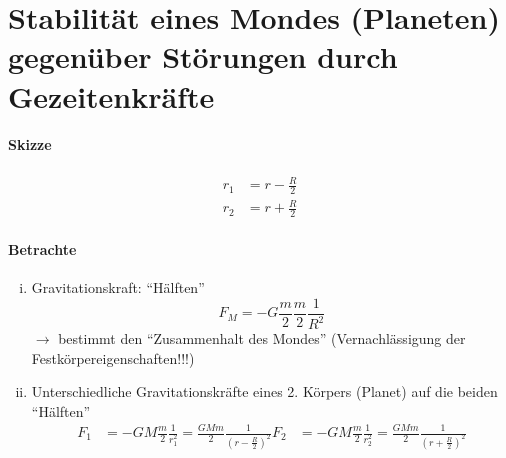 \section{Stabilität eines Mondes (Planeten) gegenüber Störungen durch 
         Gezeitenkräfte}
\paragraph{Skizze}
\begin{center}
\end{center}
\begin{align*}
    r_1 &= r - \frac{R}{2} \\
    r_2 &= r + \frac{R}{2}
\end{align*}

\paragraph{Betrachte}
\begin{enumerate}[i)]
    \item Gravitationskraft: "`Hälften"'
        \[ F_M = - G \frac{m}{2} \frac{m}{2} \frac{1}{R^2} \]
        $\rightarrow$ bestimmt den "`Zusammenhalt des Mondes"'
        (Vernachlässigung der Festkörpereigenschaften!!!)
    \item Unterschiedliche Gravitationskräfte eines 2. Körpers (Planet) auf
        die beiden "`Hälften"'
        \begin{align*}
            F_1 &= -G M \frac{m}{2} \frac{1}{r_1^2} = \frac{GMm}{2} \frac{1}{\left(r-\frac{R}{2}\right)^2}
            F_2 &= -G M \frac{m}{2} \frac{1}{r_2^2} = \frac{GMm}{2} \frac{1}{\left(r+\frac{R}{2}\right)^2}
        \end{align*}
\end{enumerate}

